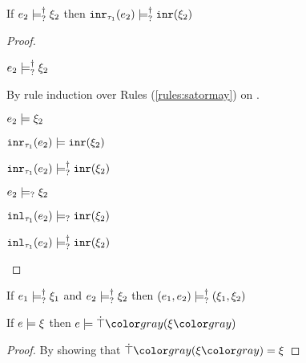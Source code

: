 \begin{lem}
  \label{lem:satormay-inr}
  If $e_2 \models_{?}^{\dag} \xi_2$ then $\mathtt{inr}_{\tau_1}({e_2}) \models_{?}^{\dag} \mathtt{inr}(\xi_2)$
\end{lem}
\begin{proof}
  \begin{pfsteps*}
  \item $e_2 \models_{?}^{\dag} \xi_2$  
  \end{pfsteps*}
  By rule induction over Rules (\ref{rules:satormay}) on .
  \begin{byCases}

  \item[\text{(\ref{rule:CSMSSat})}]
    \begin{pfsteps*}
    \item $e_2 \models \xi_2$  
    \item $\mathtt{inr}_{\tau_1}({e_2}) \models \mathtt{inr}(\xi_2)$  
    \item $\mathtt{inr}_{\tau_1}({e_2}) \models_{?}^{\dag} \mathtt{inr}(\xi_2)$ 
    \end{pfsteps*}

  \item[\text{(\ref{rule:CSMSMay})}]
    \begin{pfsteps*}
    \item $e_2 \models_{?} \xi_2$  
    \item $\mathtt{inl}_{\tau_1}({e_2}) \models_{?} \mathtt{inr}(\xi_2)$  
    \item $\mathtt{inl}_{\tau_1}({e_2}) \models_{?}^{\dag} \mathtt{inr}(\xi_2)$ 
    \end{pfsteps*}
  \end{byCases}
  \resetpfcounter
\end{proof}

\begin{lem}
  \label{lem:satormay-pair}
  If $e_1 \models_{?}^{\dag} \xi_1$ and $e_2 \models_{?}^{\dag} \xi_2$ then $(e_1 , e_2) \models_{?}^{\dag} (\xi_1 , \xi_2)$
\end{lem}

\begin{lem}
  \label{lem:satisfy-truify}
  If $e \models \xi$ then $\csatisfy{e}{\ctruify{\xi}}$
\end{lem}
\begin{proof}
  By showing that $\ctruify{\xi} = \xi$
\end{proof}


